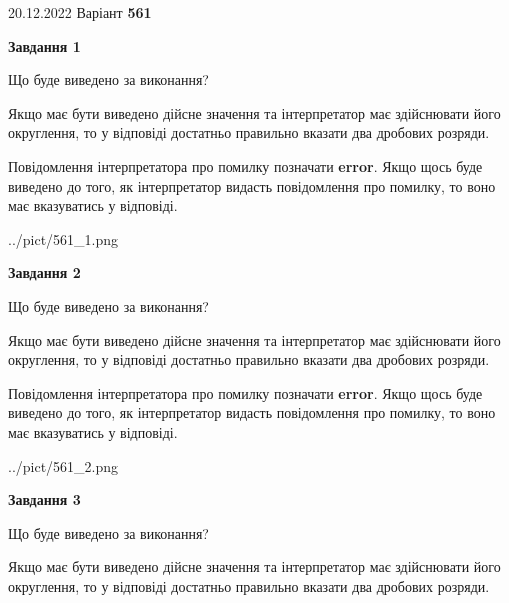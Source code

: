 \documentclass[12pt, ukrainian]{article}
\begin{document}
{20.12.2022 Варіант \No \textbf { 561 }\par}
{
\begin {Large}

{\begin {center}\textbf{Завдання 1}\end {center}}\par
Що буде виведено за виконання? \par

Якщо має бути виведено дійсне значення та інтерпретатор має здійснювати його округлення, 
то у відповіді достатньо правильно вказати два дробових розряди.

Повідомлення інтерпретатора про помилку позначати \textbf{error}.
Якщо щось буде виведено до того, як інтерпретатор видасть повідомлення про помилку, 
то воно має вказуватись у відповіді. \par

\begin{center}
	{../pict/561_1.png}
\end{center}
\newpage

{\begin {center}\textbf{Завдання 2}\end {center}}\par
Що буде виведено за виконання? \par

Якщо має бути виведено дійсне значення та інтерпретатор має здійснювати його округлення, 
то у відповіді достатньо правильно вказати два дробових розряди.

Повідомлення інтерпретатора про помилку позначати \textbf{error}.
Якщо щось буде виведено до того, як інтерпретатор видасть повідомлення про помилку, 
то воно має вказуватись у відповіді. \par

\begin{center}
	{../pict/561_2.png}
\end{center}
\newpage

{\begin {center}\textbf{Завдання 3}\end {center}}\par
Що буде виведено за виконання? \par

Якщо має бути виведено дійсне значення та інтерпретатор має здійснювати його округлення, 
то у відповіді достатньо правильно вказати два дробових розряди.


\end{Large}}
\end{document}

